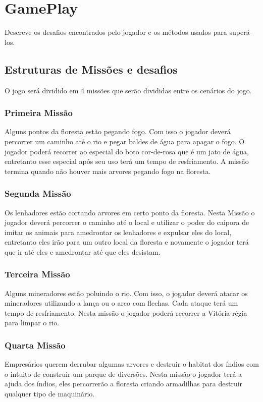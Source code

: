 \section {GamePlay}
\label{ap:gameplay}
Descreve os desafios encontrados pelo jogador e os métodos usados para superá-los.

\subsection {Estruturas de Missões e desafios}
O jogo será dividido em 4 missões que serão divididas entre os cenários do jogo.

\subsubsection{Primeira Missão}
Alguns pontos da floresta estão pegando fogo. Com isso o jogador deverá percorrer um caminho até o rio e pegar baldes de água para apagar o fogo. O jogador poderá recorrer ao especial do boto cor-de-rosa que é um jato de água, entretanto esse especial após seu uso terá um tempo de resfriamento. A missão termina quando não houver mais arvores pegando fogo na floresta.

\subsubsection{Segunda Missão}
Os lenhadores estão cortando arvores em certo ponto da floresta. Nesta Missão o jogador deverá percorrer o caminho até o local e utilizar o poder do caipora de imitar os animais para amedrontar os lenhadores e expulsar eles do local, entretanto eles irão para um outro local da floresta e novamente o jogador terá que ir até eles e amedrontar até que eles desistam.

\subsubsection{Terceira Missão}
Alguns mineradores estão poluindo o rio. Com isso, o jogador deverá atacar os mineradores utilizando a lança ou o arco com flechas. Cada ataque terá um tempo de resfriamento. Nesta missão o jogador poderá recorrer a Vitória-régia para limpar o rio.

\subsubsection{Quarta Missão}
Empresários querem derrubar algumas arvores e destruir o habitat dos índios com o intuito de construir um parque de diversões. Nesta missão o jogador terá a ajuda dos índios, eles percorrerão a floresta criando armadilhas para destruir qualquer tipo de maquinário.

